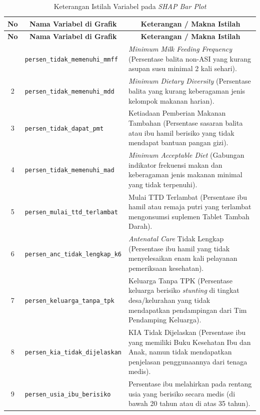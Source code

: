 \begin{longtable}{|c|p{}|p{}|}
    \caption{Keterangan Istilah Variabel pada \textit{SHAP Bar Plot}}
    \label{table:4.legenda_shap}\\
    \hline
    \textbf{No} & \multicolumn{1}{c|}{\textbf{Nama Variabel di Grafik}} & \multicolumn{1}{c|}{\textbf{Keterangan / Makna Istilah}} \tabularnewline 
    \hline
    \endfirsthead
    \hline
    \textbf{No} & \multicolumn{1}{c|}{\textbf{Nama Variabel di Grafik}} & \multicolumn{1}{c|}{\textbf{Keterangan / Makna Istilah}} \tabularnewline 
    \hline
    \endhead
    \hline
    \endfoot
    \hline
    \endlastfoot
    1 & \texttt{persen\_\allowbreak tidak\_\allowbreak memenuhi\_\allowbreak mmff} & \textit{Minimum Milk Feeding Frequency} (Persentase balita non-ASI yang kurang asupan susu minimal 2 kali sehari). \tabularnewline
    \hline
    2 & \texttt{persen\_\allowbreak tidak\_\allowbreak memenuhi\_\allowbreak mdd} & \textit{Minimum Dietary Diversity} (Persentase balita yang kurang keberagaman jenis kelompok makanan harian). \tabularnewline
    \hline
    3 & \texttt{persen\_\allowbreak tidak\_\allowbreak dapat\_\allowbreak pmt} & Ketiadaan Pemberian Makanan Tambahan (Persentase sasaran balita atau ibu hamil berisiko yang tidak mendapat bantuan pangan gizi). \tabularnewline
    \hline
    4 & \texttt{persen\_\allowbreak tidak\_\allowbreak memenuhi\_\allowbreak mad} & \textit{Minimum Acceptable Diet} (Gabungan indikator frekuensi makan dan keberagaman jenis makanan minimal yang tidak terpenuhi). \tabularnewline
    \hline
    5 & \texttt{persen\_\allowbreak mulai\_\allowbreak ttd\_\allowbreak terlambat} & Mulai TTD Terlambat (Persentase ibu hamil atau remaja putri yang terlambat mengonsumsi suplemen Tablet Tambah Darah). \tabularnewline
    \hline
    6 & \texttt{persen\_\allowbreak anc\_\allowbreak tidak\_\allowbreak lengkap\_\allowbreak k6} & \textit{Antenatal Care} Tidak Lengkap (Persentase ibu hamil yang tidak menyelesaikan enam kali pelayanan pemeriksaan kesehatan). \tabularnewline
    \hline
    7 & \texttt{persen\_\allowbreak keluarga\_\allowbreak tanpa\_\allowbreak tpk} & Keluarga Tanpa TPK (Persentase keluarga berisiko \textit{stunting} di tingkat desa/kelurahan yang tidak mendapatkan pendampingan dari Tim Pendamping Keluarga). \tabularnewline
    \hline
    8 & \texttt{persen\_\allowbreak kia\_\allowbreak tidak\_\allowbreak dijelaskan} & KIA Tidak Dijelaskan (Persentase ibu yang memiliki Buku Kesehatan Ibu dan Anak, namun tidak mendapatkan penjelasan penggunaannya dari tenaga medis). \tabularnewline
    \hline
    9 & \texttt{persen\_\allowbreak usia\_\allowbreak ibu\_\allowbreak berisiko} & Persentase ibu melahirkan pada rentang usia yang berisiko secara medis (di bawah 20 tahun atau di atas 35 tahun). \tabularnewline
    \hline
\end{longtable}

